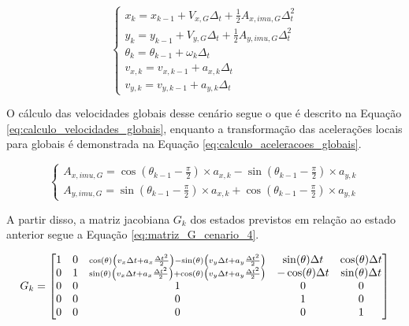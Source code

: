 \documentclass[acronym, symbols, table]{fei}
\begin{document}
			\begin{equation}\label{eq:predicao_cenario_4}
				\begin{cases}
					x_{k} = x_{k-1} + V_{x,G} \Delta_t + \frac{1}{2}A_{x,imu,G} \Delta_t^2 \\
					y_{k} = y_{k-1} + V_{y,G} \Delta_t + \frac{1}{2}A_{y,imu,G} \Delta_t^2 \\
					\theta_{k} = \theta_{k-1} + \omega_{k} \Delta_t \\
					v_{x,k} = v_{x,k-1} + a_{x,k} \Delta_t\\
					v_{y,k} = v_{y,k-1} + a_{y,k} \Delta_t
				\end{cases}
			\end{equation}

			O cálculo das velocidades globais desse cenário segue o que é descrito na Equação \eqref{eq:calculo_velocidades_globais}, enquanto a transformação das acelerações locais para globais é demonstrada na Equação \eqref{eq:calculo_aceleracoes_globais}.
			
			\begin{equation}\label{eq:calculo_aceleracoes_globais}
				\begin{cases}
					A_{x,imu,G} = \cos(\theta_{k-1} - \frac{\pi}{2}) \times a_{x,k} - \sin(\theta_{k-1} - \frac{\pi}{2}) \times a_{y,k} \\
					A_{y,imu,G} = \sin(\theta_{k-1} - \frac{\pi}{2}) \times a_{x,k} + \cos(\theta_{k-1} - \frac{\pi}{2}) \times a_{y,k}
				\end{cases}
			\end{equation}
		
			A partir disso, a matriz jacobiana $G_{k}$ dos estados previstos em relação ao estado anterior segue a Equação \eqref{eq:matriz_G_cenario_4}.
			
			\renewcommand{\arraystretch}{1.2}
			\begin{equation}\label{eq:matriz_G_cenario_4}
				G_k = 
				\begin{bmatrix}
					1 & 0 & 
					\smash{\scriptstyle 
						\cos(\theta)\left( v_x \Delta t + a_x \frac{\Delta t^2}{2} \right) 
						- \sin(\theta)\left( v_y \Delta t + a_y \frac{\Delta t^2}{2} \right)} 
					& \sin(\theta) \Delta t 
					& \cos(\theta) \Delta t 
					\\
					0 & 1 & 
					\smash{\scriptstyle 
						\sin(\theta)\left( v_x \Delta t + a_x \frac{\Delta t^2}{2} \right) 
						+ \cos(\theta)\left( v_y \Delta t + a_y \frac{\Delta t^2}{2} \right)} 
					& -\cos(\theta) \Delta t 
					& \sin(\theta) \Delta t 
					\\
					0 & 0 & 1 & 0 & 0 \\
					0 & 0 & 0 & 1 & 0 \\
					0 & 0 & 0 & 0 & 1 \\
				\end{bmatrix}
			\end{equation}
		
\end{document}
